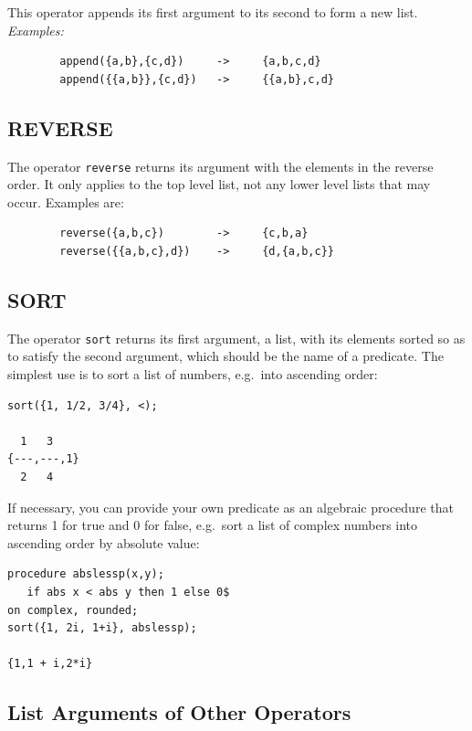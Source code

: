 This operator appends its first argument to its second to
form a new list.
\textit{Examples:}
\begin{verbatim}
        append({a,b},{c,d})     ->     {a,b,c,d}
        append({{a,b}},{c,d})   ->     {{a,b},c,d}
\end{verbatim}

\subsection{REVERSE}
\hypertarget{operator:REVERSE}{}

The operator \texttt{reverse} returns its argument with the
elements in the reverse order.  It only applies to the top level list, not
any lower level lists that may occur.  Examples are:
\begin{verbatim}
        reverse({a,b,c})        ->     {c,b,a}
        reverse({{a,b,c},d})    ->     {d,{a,b,c}}
\end{verbatim}

\subsection{SORT}
\hypertarget{operator:SORT}{}

The operator \texttt{sort} returns its
first argument, a list, with its elements sorted so as to satisfy the
second argument, which should be the name of a predicate.  The
simplest use is to sort a list of numbers, e.g.\ into ascending order:
\begin{verbatim}
sort({1, 1/2, 3/4}, <);

  1   3
{---,---,1}
  2   4
\end{verbatim}
If necessary, you can provide your own predicate as an algebraic
procedure that returns 1 for true and 0 for false, e.g.\ sort a list
of complex numbers into ascending order by absolute value:
\begin{verbatim}
procedure abslessp(x,y);
   if abs x < abs y then 1 else 0$
on complex, rounded;
sort({1, 2i, 1+i}, abslessp);

{1,1 + i,2*i}
\end{verbatim}

\subsection{List Arguments of Other Operators}
\hypertarget{switch:LISTARGS}{}
\hypertarget{command:LISTARGP}{}

